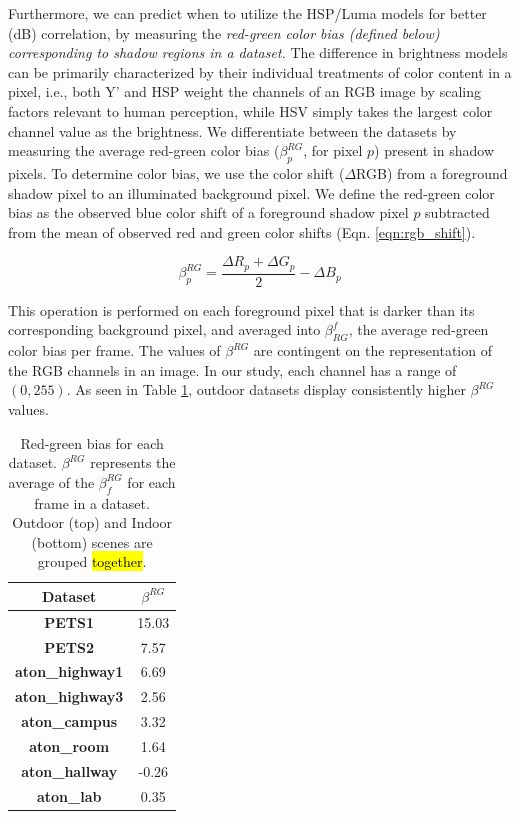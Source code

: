 Furthermore, we can predict when to utilize the HSP/Luma models for better (dB) correlation, by measuring the \textit{red-green color bias (defined below) corresponding to shadow regions in a dataset.} The difference in brightness models can be primarily characterized by their individual treatments of color content in a pixel, i.e., both Y' and HSP weight the channels of an RGB image by scaling factors relevant to human perception, while HSV simply takes the largest color channel value as the brightness. We differentiate between the datasets by measuring the average red-green color bias ($\beta^{RG}_{p}$, for pixel $p$) present in shadow pixels. To determine color bias, we use the color shift ($\Delta$RGB) from a foreground shadow pixel to an illuminated background pixel. We define the red-green color bias as the observed blue color shift of a foreground shadow pixel $p$ subtracted from the mean of observed red and green color shifts (Eqn. \ref{eqn:rgb_shift}).

\begin{equation}
\beta^{RG}_{p} = \dfrac{\Delta R_{p} + \Delta G_{p}}{2} - \Delta B_{p}
\label{eqn:rgb_shift}
\end{equation}

This operation is performed on each foreground pixel that is darker than its corresponding background pixel, and averaged into $\beta^{f}_{RG}$, the average red-green color bias per frame. The values of $\beta^{RG}$ are contingent on the representation of the RGB channels in an image. In our study, each channel has a range of $(0, 255)$. As seen in Table \ref{table:rg_bias}, outdoor datasets display consistently higher $\beta^{RG}$ values.

\begin{table}
\centering
\begin{tabular}{ |c|c| }
	\hline
	\textbf{Dataset} & \textbf{$\beta^{RG}$} \\
	\hline
	\hline
	\textbf{PETS1} & 15.03 \\
	\hline
	\textbf{PETS2} & 7.57 \\
	\hline
	\textbf{aton\_highway1} & 6.69 \\
	\hline
	\textbf{aton\_highway3} & 2.56 \\
	\hline
	\textbf{aton\_campus} & 3.32 \\
	\hline
	\hline
	\textbf{aton\_room} & 1.64 \\
	\hline
	\textbf{aton\_hallway} & -0.26 \\
	\hline
	\textbf{aton\_lab} & 0.35 \\
	\hline
\end{tabular}
\caption{Red-green bias for each dataset. $\beta^{RG}$ represents the average of the $\beta^{RG}_{f}$ for each frame in a dataset. Outdoor (top) and Indoor (bottom) scenes are grouped \hl{together}.}
\label{table:rg_bias}
\end{table}

